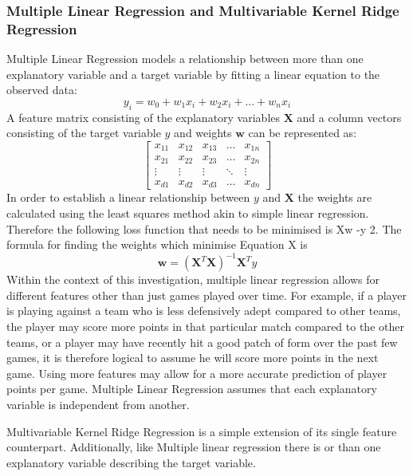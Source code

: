 \documentclass[a4paper,11pt,twoside]{article}
\begin{document}
\subsubsection{Multiple Linear Regression and Multivariable Kernel Ridge Regression}

Multiple Linear Regression models a relationship between more than one explanatory variable and a target variable by fitting a linear equation to the observed data:
\begin{equation}
y_{i} = w_{0} + w_{1}x_{i} + w_{2}x_{i} +  ... + w_{n}x_{i}
\end{equation}
A feature matrix consisting of the explanatory variables $\textbf{X}$ and a column vectors consisting of the target variable $y$ and weights $\textbf{w}$ can be represented as:
\[
\begin{bmatrix}
    x_{11} & x_{12} & x_{13} & \dots  & x_{1n} \\
    x_{21} & x_{22} & x_{23} & \dots  & x_{2n} \\
    \vdots & \vdots & \vdots & \ddots & \vdots \\
    x_{d1} & x_{d2} & x_{d3} & \dots  & x_{dn}
\end{bmatrix}
\]
In order to establish a linear relationship between $y$ and $\textbf{X}$ the weights are calculated using the least squares method akin to simple linear regression. Therefore the following loss function that needs to be minimised is Xw -y 2. The formula for finding the weights which minimise Equation X is
\begin{equation}
\textbf{w} = (\textbf{X}^T\textbf{X})^{-1}\textbf{X}^Ty
\end{equation}
Within the context of this investigation, multiple linear regression allows for different features other than just games played over time. For example, if a player is playing against a team who is less defensively adept compared to other teams, the player may score more points in that particular match compared to the other teams, or a player may have recently hit a good patch of form over the past few games, it is therefore logical to assume he will score more points in the next game. Using more features may allow for a more accurate prediction of player points per game. Multiple Linear Regression assumes that each explanatory variable is independent from another.

Multivariable Kernel Ridge Regression is a simple extension of its single feature counterpart. Additionally, like Multiple linear regression  there is or than one explanatory variable describing the target variable. 
\end{document}
